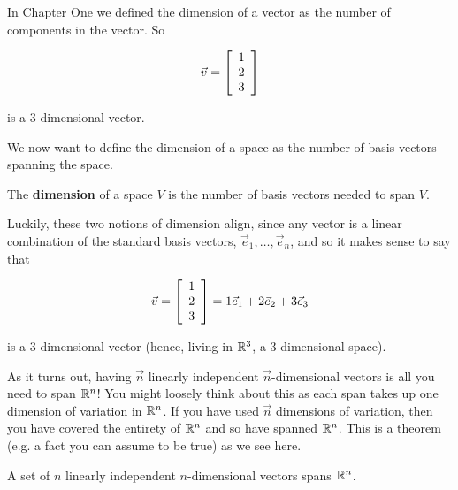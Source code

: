 \documentclass{ximera}
\begin{document}
\begin{remark}

  In Chapter One we defined the dimension of a vector as the number of components in the vector. So 

  $$\vec{v}=\startmat{r} 1 \\ 2 \\ 3 \stopmat$$

  is a 3-dimensional vector.

  We now want to define the dimension of a space as the number of basis vectors spanning the space.

  \begin{definition}
  
    The \textbf{dimension} of a space $V$ is the number of basis vectors needed to span $V$.

  \end{definition}

  Luckily, these two notions of dimension align, since any vector is a linear combination of the standard basis vectors, $\vec{e}_1,\ldots,\vec{e}_n$, and so it makes sense to say that 

  $$\vec{v}=\startmat{r} 1 \\ 2 \\ 3 \stopmat=1\vec{e}_1+2\vec{e}_2+3\vec{e}_3$$

  is a 3-dimensional vector (hence, living in $\R^3$, a 3-dimensional space).

\end{remark}

As it turns out, having $\vec{n}$ linearly independent $\vec{n}$-dimensional vectors is all you need to span $\RR^n$! You might loosely think about this as each span takes up one dimension of variation in $\RR^n$. If you have used $\vec{n}$ dimensions of variation, then you have covered the entirety of $\RR^n$ and so have spanned $\RR^n$. This is a theorem (e.g. a fact you can assume to be true) as we see here.

\begin{theorem}
  A set of $n$ linearly independent $n$-dimensional vectors spans $\RR^n$.
\end{theorem}
\end{document}
